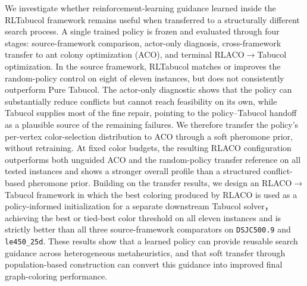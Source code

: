 
We investigate whether reinforcement-learning guidance learned inside the RLTabucol framework remains useful when transferred to a
structurally different search process. A single trained policy is frozen and
evaluated through four stages: source-framework comparison, actor-only
diagnosis, cross-framework transfer to ant colony optimization (ACO), and
terminal RLACO$\rightarrow$Tabucol optimization. In the source framework,
RLTabucol matches or improves the random-policy control on eight of eleven
instances, but does not consistently outperform Pure Tabucol. The actor-only diagnostic shows that the policy can substantially reduce conflicts but cannot reach feasibility on its own, while Tabucol supplies most of the fine repair, pointing to the policy--Tabucol handoff as a plausible source of the remaining failures. We therefore transfer the policy's
per-vertex color-selection distribution to ACO through a soft pheromone prior,
without retraining. At fixed color budgets, the resulting RLACO configuration
outperforms both unguided ACO and the random-policy transfer reference on all
tested instances and shows a stronger overall profile than a structured
conflict-based pheromone prior. Building on the transfer results, we design an RLACO$\rightarrow$Tabucol framework in which the best coloring produced by RLACO is used as a policy-informed initialization for a separate downstream Tabucol solver， achieving the best or tied-best color threshold on all eleven instances and is
strictly better than all three source-framework comparators on
\texttt{DSJC500.9} and \texttt{le450\_25d}. These results show that a learned
policy can provide reusable search guidance across heterogeneous
metaheuristics, and that soft transfer through population-based construction
can convert this guidance into improved final graph-coloring performance.
